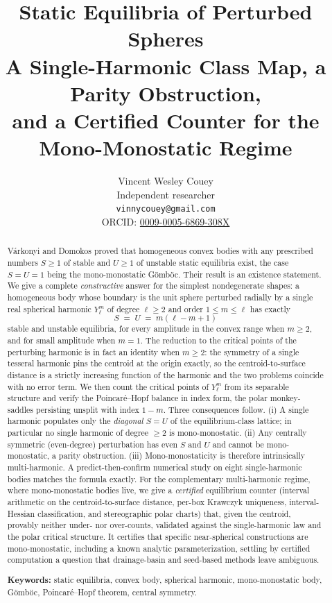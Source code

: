 \documentclass[11pt,a4paper]{article}
\title{\textbf{Static Equilibria of Perturbed Spheres}\\[6pt]
\large A Single-Harmonic Class Map, a Parity Obstruction,\\
and a Certified Counter for the Mono-Monostatic Regime}
\author{Vincent Wesley Couey\\[2pt]\small Independent researcher\\[2pt]
\small\texttt{vinnycouey@gmail.com}\\[2pt]
\small ORCID: \href{https://orcid.org/0009-0005-6869-308X}{0009-0005-6869-308X}}
\date{}
\theoremstyle{definition}
\begin{document}
\maketitle

\begin{abstract}
V\'arkonyi and Domokos proved that homogeneous convex bodies with any prescribed numbers $S\ge1$ of stable and
$U\ge1$ of unstable static equilibria exist, the case $S=U=1$ being the mono-monostatic G\"omb\"oc. Their
result is an existence statement. We give a complete \emph{constructive} answer for the simplest
nondegenerate shapes: a homogeneous body whose boundary is the unit sphere perturbed radially by a single real
spherical harmonic $Y_\ell^m$ of degree $\ell\ge2$ and order $1\le m\le\ell$ has exactly
\[
S \;=\; U \;=\; m(\ell-m+1)
\]
stable and unstable equilibria, for every amplitude in the convex range when $m\ge2$, and for small amplitude
when $m=1$. The reduction to the critical points of the perturbing harmonic is in fact an identity when
$m\ge2$: the symmetry of a single tesseral harmonic pins the centroid at the origin exactly, so the
centroid-to-surface distance is a strictly increasing function of the harmonic and the two problems coincide
with no error term. We then count the critical points of $Y_\ell^m$ from its separable structure and verify
the Poincar\'e--Hopf balance in index form, the polar monkey-saddles persisting unsplit with index $1-m$.
Three consequences follow. (i) A single harmonic populates only the \emph{diagonal}
$S=U$ of the equilibrium-class lattice; in particular no single harmonic of degree $\ge2$ is
mono-monostatic. (ii) Any centrally symmetric (even-degree) perturbation has even $S$ and $U$ and cannot be
mono-monostatic, a parity obstruction. (iii) Mono-monostaticity is therefore intrinsically multi-harmonic.
A predict-then-confirm numerical study on eight single-harmonic bodies matches the formula exactly. For the
complementary multi-harmonic regime, where mono-monostatic bodies live, we give a \emph{certified} equilibrium
counter (interval arithmetic on the centroid-to-surface distance, per-box Krawczyk uniqueness,
interval-Hessian classification, and stereographic polar charts) that, given the centroid, provably neither
under- nor over-counts, validated against the single-harmonic law and the polar critical structure. It
certifies that specific near-spherical constructions are mono-monostatic, including a known analytic
parameterization, settling by certified computation a question that drainage-basin and seed-based methods
leave ambiguous.

\medskip\noindent\textbf{Keywords:} static equilibria, convex body, spherical harmonic, mono-monostatic body,
G\"omb\"oc, Poincar\'e--Hopf theorem, central symmetry.
\end{abstract}
\end{document}
